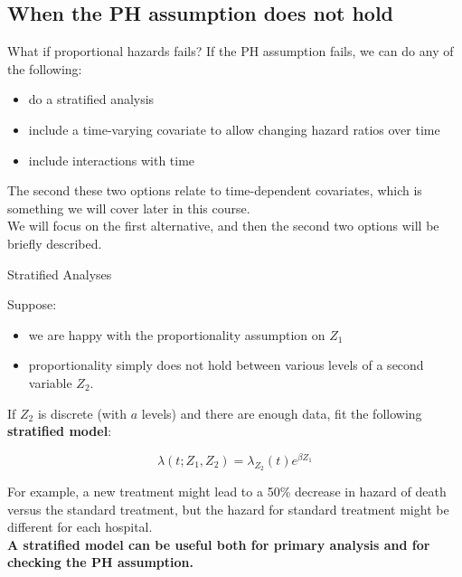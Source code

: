 \documentclass[envcountsect, 10pt, portrait, palatino]{beamer}
\begin{document}
\subsection{When the PH assumption does not hold}
\begin{frame}{What if proportional hazards fails?}
If the PH assumption fails, we can do any of the following:
\begin{itemize}
\item do a stratified analysis

\item include a time-varying covariate to
       allow changing  hazard ratios over time

\item include interactions with time
\end{itemize}

The second these two options relate to time-dependent covariates,
which is something we will cover later in this course.
\\[2ex]
We will focus on the first alternative, and then the second
two options will be briefly described.
\end{frame}
\begin{frame}{Stratified Analyses}

Suppose:
\begin{itemize}
\item we are happy with the proportionality assumption on $Z_1$
\item proportionality simply does not hold between various
levels of a second variable  $Z_2$.
\end{itemize}

If $Z_2$ is discrete (with $a$ levels) and there are enough data,
fit the following {\bf stratified model}:

\[   \lambda(t; Z_1, Z_2)  = \lambda_{Z_2}(t) e^{\beta Z_1} \]

For example, a new treatment might lead to a 50\% decrease
in hazard of death versus the standard treatment, but the
hazard for standard treatment might be different for
each hospital.
\\[2ex]
{\bf A stratified model can be useful both for primary analysis
and for checking the PH assumption.}
\end{frame}
\end{document}
